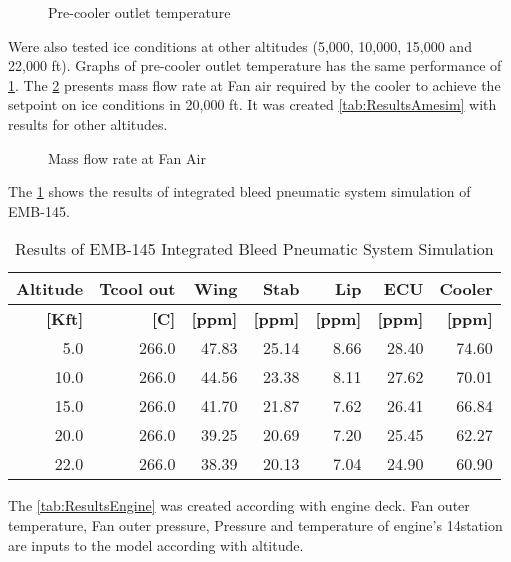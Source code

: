 \begin{figure}[H] %
\caption{Pre-cooler outlet temperature}
\label{fig:PCT}
\end{figure}

Were also tested ice conditions at other altitudes (5,000, 10,000, 15,000 and 22,000 ft). Graphs of pre-cooler outlet temperature has the same performance of \ref{fig:PCT}.
The \ref{fig:Flowrate} presents mass flow rate at Fan air required by the cooler to achieve the setpoint on ice conditions in 20,000 ft. It was created \ref{tab:ResultsAmesim} with results for other altitudes.

\begin{figure}[H] %
\caption{Mass flow rate at Fan Air}
\label{fig:Flowrate}
\end{figure}

The \ref{tab:ResultsIBPS} shows the results of integrated bleed pneumatic system simulation of EMB-145.

\begin{table}[htbp]
  \centering
  \caption{Results of EMB-145 Integrated Bleed Pneumatic System Simulation}
    \begin{tabular}{rrrrrrr}
    \toprule
    \textbf{Altitude} & \textbf{Tcool out} & \textbf{Wing} & \textbf{Stab} & \textbf{Lip} & \textbf{ECU} & \textbf{Cooler} \\
    \midrule
    \textbf{[Kft]} & \textbf{[C]} & \textbf{[ppm]} & \textbf{[ppm]} & \textbf{[ppm]} & \textbf{[ppm]} & \textbf{[ppm]} \\
    5.0   & 266.0 & 47.83 & 25.14 & 8.66  & 28.40 & 74.60 \\
    10.0  & 266.0 & 44.56 & 23.38 & 8.11  & 27.62 & 70.01 \\
    15.0  & 266.0 & 41.70 & 21.87 & 7.62  & 26.41 & 66.84 \\
    20.0  & 266.0 & 39.25 & 20.69 & 7.20  & 25.45 & 62.27 \\
    22.0  & 266.0 & 38.39 & 20.13 & 7.04  & 24.90 & 60.90 \\
    \bottomrule
    \end{tabular}%
  \label{tab:ResultsIBPS}%
\end{table}%

The \ref{tab:ResultsEngine} was created according with engine deck. Fan outer temperature, Fan outer pressure, Pressure and temperature of engine's 14\degree station are inputs to the model according with altitude.

